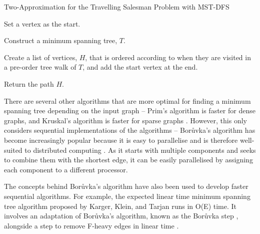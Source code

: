 \documentclass[a4paper, 11pt]{article}
\begin{document}
\begin{algorithm}
    \caption{Two-Approximation for the Travelling Salesman Problem with MST-DFS \cite{andreae1995performance}}
    \nl Set a vertex as the start.
    
    \nl Construct a minimum spanning tree, $T$.
    
    \nl Create a list of vertices, $H$, that is ordered according to when they are visited in a pre-order tree walk of $T$, and add the start vertex at the end.
    
    \nl Return the path $H$.
\end{algorithm}


There are several other algorithms that are more optimal for finding a minimum spanning tree depending on the input graph -- Prim's algorithm is faster for dense graphs, and Kruskal's algorithm is faster for sparse graphs \cite{bazlamaccci2001minimum}. However, this only considers sequential implementations of the algorithms -- Borůvka's algorithm has become increasingly popular because it is easy to parallelise and is therefore well-suited to distributed computing \cite{mariano2015generic}. As it starts with multiple components and seeks to combine them with the shortest edge, it can be easily parallelised by assigning each component to a different processor.

The concepts behind Borůvka's algorithm have also been used to develop faster sequential algorithms. For example, the expected linear time minimum spanning tree algorithm proposed by Karger, Klein, and Tarjan runs in O(E) time. It involves an adaptation of Borůvka's algorithm, known as the Borůvka step \cite{dixon1992verification, king1995simpler}, alongside a step to remove F-heavy edges in linear time \cite{karger1995randomized}.

\newpage


\end{document}

